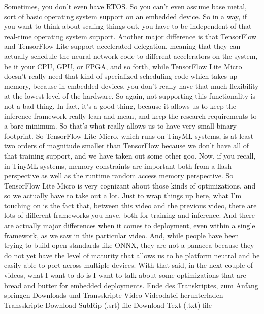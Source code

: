 {{{{{    Sometimes, you don't even have RTOS.
    So you can't even assume base metal, sort of basic operating system
    support on an embedded device.
    So in a way, if you want to think about scaling things out,
    you have to be independent of that real-time operating system support.
    Another major difference is that TensorFlow and TensorFlow Lite support
    accelerated delegation, meaning that they can actually
    schedule the neural network code to different accelerators on the system,
    be it your CPU, GPU, or FPGA, and so forth,
    while TensorFlow Lite Micro doesn't really
    need that kind of specialized scheduling code which takes up memory,
    because in embedded devices, you don't really
    have that much flexibility at the lowest level of the hardware.
    So again, not supporting this functionality is not a bad thing.
    In fact, it's a good thing, because it allows
    us to keep the inference framework really lean
    and mean, and keep the research requirements to a bare minimum.
    So that's what really allows us to have very small binary footprint.
    So TensorFlow Lite Micro, which runs on TinyML systems,
    is at least two orders of magnitude smaller than TensorFlow
    because we don't have all of that training support,
    and we have taken out some other goo.
    Now, if you recall, in TinyML systems, memory constraints
    are important both from a flash perspective as well as
    the runtime random access memory perspective.
    So TensorFlow Lite Micro is very cognizant about those kinds
    of optimizations, and so we actually have to take out a lot.
    Just to wrap things up here, what I'm touching on
    is the fact that, between this video and the previous video,
    there are lots of different frameworks you have,
    both for training and inference.
    And there are actually major differences when
    it comes to deployment, even within a single framework,
    as we saw in this particular video.
    And, while people have been trying to build open standards like ONNX,
    they are not a panacea because they do not yet
    have the level of maturity that allows us to be platform neutral
    and be easily able to port across multiple devices.
    With that said, in the next couple of videos, what I want to do
    is I want to talk about some optimizations that are bread
    and butter for embedded deployments.
    Ende des Transkriptes, zum Anfang springen
    Downloads und Transskripte
    Video
    Videodatei herunterladen
    Transskripte
    Download SubRip (.srt) file
    Download Text (.txt) file  
 
}}}}}
